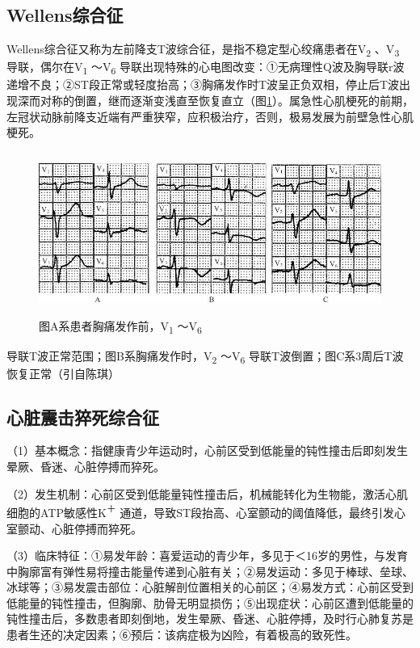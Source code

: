 \protect\hypertarget{text00047.htmlux5cux23subid574}{}{}

\subsection{Wellens综合征}

Wellens综合征又称为左前降支T波综合征，是指不稳定型心绞痛患者在V\textsubscript{2}
、V\textsubscript{3} 导联，偶尔在V\textsubscript{1} ～V\textsubscript{6}
导联出现特殊的心电图改变：①无病理性Q波及胸导联r波递增不良；②ST段正常或轻度抬高；③胸痛发作时T波呈正负双相，停止后T波出现深而对称的倒置，继而逐渐变浅直至恢复直立（图\ref{fig40-17}）。属急性心肌梗死的前期，左冠状动脉前降支近端有严重狭窄，应积极治疗，否则，极易发展为前壁急性心肌梗死。

\begin{figure}[!htbp]
 \centering
 \includegraphics[width=5.16667in,height=2.10417in]{./images/Image00679.jpg}
 \captionsetup{justification=centering}
 \caption{图A系患者胸痛发作前，V\textsubscript{1} ～V\textsubscript{6}}
 \label{fig40-17}
  \end{figure} 
导联T波正常范围；图B系胸痛发作时，V\textsubscript{2}
～V\textsubscript{6} 导联T波倒置；图C系3周后T波恢复正常（引自陈琪）

\protect\hypertarget{text00047.htmlux5cux23subid575}{}{}

\subsection{心脏震击猝死综合征}

（1）基本概念：指健康青少年运动时，心前区受到低能量的钝性撞击后即刻发生晕厥、昏迷、心脏停搏而猝死。

（2）发生机制：心前区受到低能量钝性撞击后，机械能转化为生物能，激活心肌细胞的ATP敏感性K\textsuperscript{＋}
通道，导致ST段抬高、心室颤动的阈值降低，最终引发心室颤动、心脏停搏而猝死。

（3）临床特征：①易发年龄：喜爱运动的青少年，多见于＜16岁的男性，与发育中胸廓富有弹性易将撞击能量传递到心脏有关；②易发运动：多见于棒球、垒球、冰球等；③易发震击部位：心脏解剖位置相关的心前区；④易发方式：心前区受到低能量的钝性撞击，但胸廓、肋骨无明显损伤；⑤出现症状：心前区遭到低能量的钝性撞击后，多数患者即刻倒地，发生晕厥、昏迷、心脏停搏，及时行心肺复苏是患者生还的决定因素；⑥预后：该病症极为凶险，有着极高的致死性。

